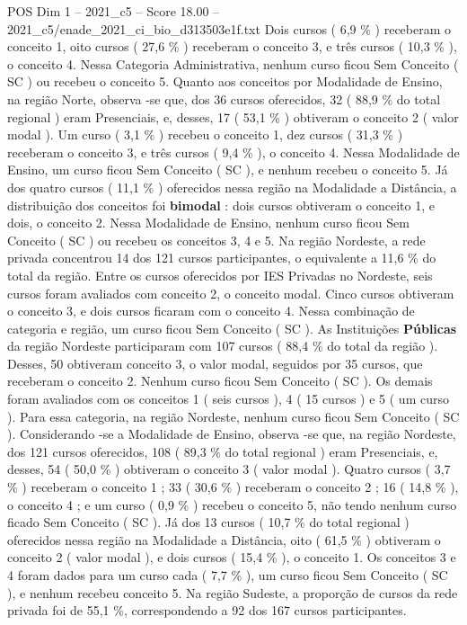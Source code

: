 \begin{textsample}{POS Dim 1 – 2021\_c5 – Score 18.00 – 2021\_c5/enade\_2021\_ci\_bio\_d313503e1f.txt}
Dois cursos ( 6,9 \% ) receberam o conceito 1, oito cursos ( 27,6 \% ) receberam o conceito 3, e três cursos ( 10,3 \% ), o conceito 4.
Nessa Categoria Administrativa, nenhum curso ficou Sem Conceito ( SC ) ou recebeu o conceito 5.
Quanto aos conceitos por Modalidade de Ensino, na região Norte, observa -se que, dos 36 cursos oferecidos, 32 ( 88,9 \% do total regional ) eram Presenciais, e, desses, 17 ( 53,1 \% ) obtiveram o conceito 2 ( valor modal ).
Um curso ( 3,1 \% ) recebeu o conceito 1, dez cursos ( 31,3 \% ) receberam o conceito 3, e três cursos ( 9,4 \% ), o conceito 4.
Nessa Modalidade de Ensino, um curso ficou Sem Conceito ( SC ), e nenhum recebeu o conceito 5.
Já dos quatro cursos ( 11,1 \% ) oferecidos nessa região na Modalidade a Distância, a distribuição dos conceitos foi \textbf{bimodal} : dois cursos obtiveram o conceito 1, e dois, o conceito 2.
Nessa Modalidade de Ensino, nenhum curso ficou Sem Conceito ( SC ) ou recebeu os conceitos 3, 4 e 5.
Na região Nordeste, a rede privada concentrou 14 dos 121 cursos participantes, o equivalente a 11,6 \% do total da região.
Entre os cursos oferecidos por IES Privadas no Nordeste, seis cursos foram avaliados com conceito 2, o conceito modal.
Cinco cursos obtiveram o conceito 3, e dois cursos ficaram com o conceito 4.
Nessa combinação de categoria e região, um curso ficou Sem Conceito ( SC ).
As Instituições \textbf{Públicas} da região Nordeste participaram com 107 cursos ( 88,4 \% do total da região ).
Desses, 50 obtiveram conceito 3, o valor modal, seguidos por 35 cursos, que receberam o conceito 2.
Nenhum curso ficou Sem Conceito ( SC ).
Os demais foram avaliados com os conceitos 1 ( seis cursos ), 4 ( 15 cursos ) e 5 ( um curso ).
Para essa categoria, na região Nordeste, nenhum curso ficou Sem Conceito ( SC ).
Considerando -se a Modalidade de Ensino, observa -se que, na região Nordeste, dos 121 cursos oferecidos, 108 ( 89,3 \% do total regional ) eram Presenciais, e, desses, 54 ( 50,0 \% ) obtiveram o conceito 3 ( valor modal ).
Quatro cursos ( 3,7 \% ) receberam o conceito 1 ; 33 ( 30,6 \% ) receberam o conceito 2 ; 16 ( 14,8 \% ), o conceito 4 ; e um curso ( 0,9 \% ) recebeu o conceito 5, não tendo nenhum curso ficado Sem Conceito ( SC ).
Já dos 13 cursos ( 10,7 \% do total regional ) oferecidos nessa região na Modalidade a Distância, oito ( 61,5 \% ) obtiveram o conceito 2 ( valor modal ), e dois cursos ( 15,4 \% ), o conceito 1.
Os conceitos 3 e 4 foram dados para um curso cada ( 7,7 \% ), um curso ficou Sem Conceito ( SC ), e nenhum recebeu conceito 5.
Na região Sudeste, a proporção de cursos da rede privada foi de 55,1 \%, correspondendo a 92 dos 167 cursos participantes.

\end{textsample}
